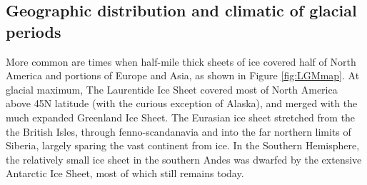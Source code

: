 \documentclass[amstex,12pt]{book}
\begin{document}
\subsection{Geographic distribution and climatic of glacial periods}
More common are times when half-mile thick sheets of ice covered half of North America and portions of Europe and Asia, as shown in Figure \ref{fig:LGMmap}.  At glacial maximum, The Laurentide Ice Sheet covered most of North America above 45\textdegree N latitude (with the curious exception of Alaska), and merged with the much expanded Greenland Ice Sheet. The Eurasian ice sheet stretched from the the British Isles, through fenno-scandanavia and into the far northern limits of Siberia, largely sparing the vast continent from ice. In the Southern Hemisphere, the relatively small ice sheet in the southern Andes was dwarfed by the extensive Antarctic Ice Sheet, most of which still remains today. \\
\end{document}
